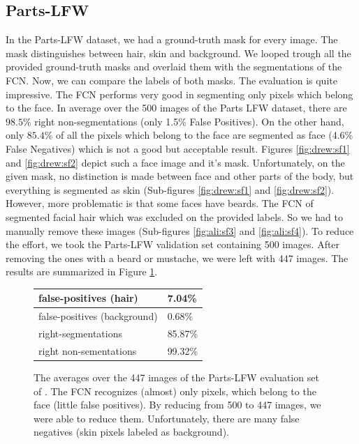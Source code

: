 \subsection{Parts-LFW}
In the Parts-LFW dataset, we had a ground-truth mask for every image. The mask distinguishes between hair, skin and background. We looped trough all the provided ground-truth masks and overlaid them with the segmentations of the FCN. Now, we can compare the labels of both masks. The evaluation is quite impressive. The FCN performs very good in segmenting only pixels which belong to the face. In average over the 500 images of the Parts LFW dataset, there are $98.5\%$ right non-segmentations (only 1.5\% False Positives). On the other hand, only $85.4\%$ of all the pixels which belong to the face are segmented as face (4.6\% False Negatives) which is not a good but acceptable result. Figures \ref{fig:drew:sf1} and \ref{fig:drew:sf2} depict such a face image and it's mask. Unfortunately, on the given mask, no distinction is made between face and other parts of the body, but everything is segmented as skin (Sub-figures \ref{fig:drew:sf1} and \ref{fig:drew:sf2}). However, more problematic is that some faces have beards. The FCN of \cite{nirkin2018_faceswap} segmented facial hair which was excluded on the provided labels. So we had to manually remove these images (Sub-figures \ref{fig:ali:sf3} and \ref{fig:ali:sf4}). To reduce the effort, we took the Parts-LFW validation set containing 500 images. After removing the ones with a beard or mustache, we were left with 447 images. The results are summarized in Figure \ref{fig:Parts-LFW}.

\begin{figure}
\begin{center}
\begin{tabular}{l|l} \hline
	false-positives (hair) & 7.04\%\\ \hline
	false-positives (background) & 0.68\%\\ \hline
	right-segmentations & 85.87\%\\ \hline
	right non-sementations & 99.32\% \\ \hline
\end{tabular}
\end{center}
\caption{The averages over the 447 images of the Parts-LFW evaluation set of \cite{LFW_dataset}. The FCN recognizes (almost) only pixels, which belong to the face (little false positives). By reducing from 500 to 447 images, we were able to reduce them. Unfortunately, there are many false negatives (skin pixels labeled as background).} 
\label{fig:Parts-LFW}
\end{figure}

